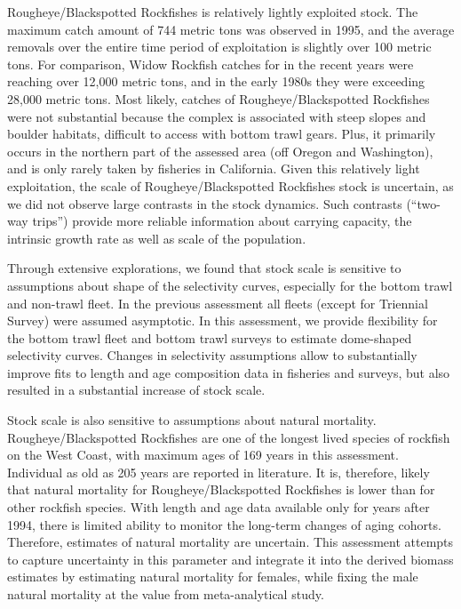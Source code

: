 \documentclass[
]{scrartcl}
\begin{document}
Rougheye/Blackspotted Rockfishes is relatively lightly exploited stock.
The maximum catch amount of 744 metric tons was observed in 1995, and
the average removals over the entire time period of exploitation is
slightly over 100 metric tons. For comparison, Widow Rockfish catches
for in the recent years were reaching over 12,000 metric tons, and in
the early 1980s they were exceeding 28,000 metric tons. Most likely,
catches of Rougheye/Blackspotted Rockfishes were not substantial because
the complex is associated with steep slopes and boulder habitats,
difficult to access with bottom trawl gears. Plus, it primarily occurs
in the northern part of the assessed area (off Oregon and Washington),
and is only rarely taken by fisheries in California. Given this
relatively light exploitation, the scale of Rougheye/Blackspotted
Rockfishes stock is uncertain, as we did not observe large contrasts in
the stock dynamics. Such contrasts (``two-way trips'') provide more
reliable information about carrying capacity, the intrinsic growth rate
as well as scale of the population.

Through extensive explorations, we found that stock scale is sensitive
to assumptions about shape of the selectivity curves, especially for the
bottom trawl and non-trawl fleet. In the previous assessment all fleets
(except for Triennial Survey) were assumed asymptotic. In this
assessment, we provide flexibility for the bottom trawl fleet and bottom
trawl surveys to estimate dome-shaped selectivity curves. Changes in
selectivity assumptions allow to substantially improve fits to length
and age composition data in fisheries and surveys, but also resulted in
a substantial increase of stock scale.

Stock scale is also sensitive to assumptions about natural mortality.
Rougheye/Blackspotted Rockfishes are one of the longest lived species of
rockfish on the West Coast, with maximum ages of 169 years in this
assessment. Individual as old as 205 years are reported in literature.
It is, therefore, likely that natural mortality for
Rougheye/Blackspotted Rockfishes is lower than for other rockfish
species. With length and age data available only for years after 1994,
there is limited ability to monitor the long-term changes of aging
cohorts. Therefore, estimates of natural mortality are uncertain. This
assessment attempts to capture uncertainty in this parameter and
integrate it into the derived biomass estimates by estimating natural
mortality for females, while fixing the male natural mortality at the
value from meta-analytical study.
\end{document}
